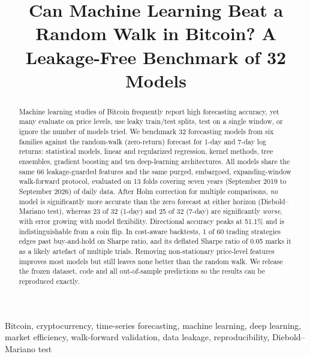 \documentclass[conference]{IEEEtran}
\begin{document}
\title{Can Machine Learning Beat a Random Walk in Bitcoin? A Leakage-Free Benchmark of 32 Models}

\author{
}

\maketitle

\begin{abstract}
Machine learning studies of Bitcoin frequently report high forecasting accuracy, yet many evaluate on price levels, use leaky train/test splits, test on a single window, or ignore the number of models tried. We benchmark 32 forecasting models from six families against the random-walk (zero-return) forecast for 1-day and 7-day log returns: statistical models, linear and regularized regression, kernel methods, tree ensembles, gradient boosting and ten deep-learning architectures. All models share the same 66 leakage-guarded features and the same purged, embargoed, expanding-window walk-forward protocol, evaluated on 13 folds covering seven years (September 2019 to September 2026) of daily data. After Holm correction for multiple comparisons, \emph{no} model is significantly more accurate than the zero forecast at either horizon (Diebold--Mariano test), whereas 23 of 32 (1-day) and 25 of 32 (7-day) are significantly \emph{worse}, with error growing with model flexibility. Directional accuracy peaks at 51.1\% and is indistinguishable from a coin flip. In cost-aware backtests, 1 of 60 trading strategies edges past buy-and-hold on Sharpe ratio, and its deflated Sharpe ratio of 0.05 marks it as a likely artefact of multiple trials. Removing non-stationary price-level features improves most models but still leaves none better than the random walk. We release the frozen dataset, code and all out-of-sample predictions so the results can be reproduced exactly.
\end{abstract}

\begin{IEEEkeywords}
Bitcoin, cryptocurrency, time-series forecasting, machine learning, deep learning, market efficiency, walk-forward validation, data leakage, reproducibility, Diebold--Mariano test
\end{IEEEkeywords}
\end{document}
